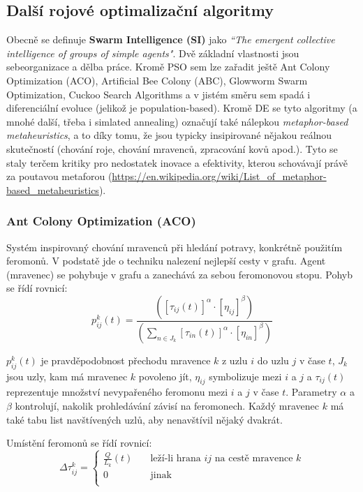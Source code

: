 \subsection{Další rojové optimalizační algoritmy}
Obecně se definuje \textbf{Swarm Intelligence (SI)} jako \textit{“The emergent collective intelligence of groups of simple agents"}. Dvě základní vlastnosti jsou sebeorganizace a dělba práce. Kromě PSO sem lze zařadit ještě Ant Colony Optimization (ACO), Artificial Bee Colony (ABC), Glowworm Swarm Optimization, Cuckoo Search Algorithms a v jistém směru sem spadá i diferenciální evoluce (jelikož je population-based). Kromě DE se tyto algoritmy (a mnohé další, třeba i simlated annealing)  označují také nálepkou \textit{metaphor-based metaheuristics}, a to díky tomu, že jsou typicky insipirované nějakou reálnou skutečností (chování roje, chování mravenců, zpracování kovů apod.). Tyto se staly terčem kritiky pro nedostatek inovace a efektivity, kterou schovávají právě za poutavou metaforou (\url{https://en.wikipedia.org/wiki/List_of_metaphor-based_metaheuristics}).

\subsubsection{Ant Colony Optimization (ACO)}
Systém inspirovaný chování mravenců při hledání potravy, konkrétně použitím feromonů. V podstatě jde o techniku nalezení nejlepší cesty v grafu. Agent (mravenec) se pohybuje v grafu a zanechává za sebou feromonovou stopu. Pohyb se řídí rovnicí:
$$p^k_{ij}(t) = \frac{([\tau_{ij}(t)]^\alpha \cdot [\eta_{ij}]^\beta)}{(\sum\limits_{n \in J_k}[\tau_{in}(t)]^\alpha \cdot [\eta_{in}]^\beta)}$$

$p^k_{ij}(t)$ je pravděpodobnost přechodu mravence $k$ z uzlu $i$ do uzlu $j$ v čase $t$, $J_k$ jsou uzly, kam má mravenec $k$ povoleno jít, $\eta_{ij}$ symbolizuje  mezi $i$ a $j$ a $\tau_{ij}(t)$ reprezentuje množství nevypařeného feromonu mezi $i$ a $j$ v čase $t$. Parametry $\alpha$ a $\beta$ kontrolují, nakolik prohledávání závisí na feromonech. Každý mravenec $k$ má také tabu list navštívených uzlů, aby nenavštívil nějaký dvakrát.

Umístění feromonů se řídí rovnicí:
\[
\Delta\tau^k_{ij} = 
\begin{cases}
	\frac{Q}{L_k}(t) 	& \quad \text{leží-li hrana $ij$ na cestě mravence $k$} \\
	0 					& \quad \text{jinak}\\
\end{cases}
\]

